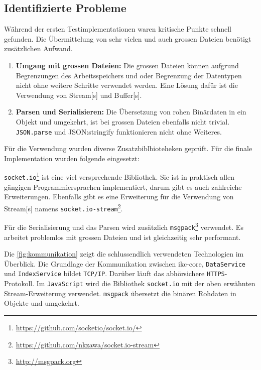 
\subsection{Identifizierte Probleme}


Während der ersten Testimplementationen waren kritische Punkte schnell gefunden. Die Übermittelung von sehr vielen und auch grossen Dateien benötigt zusätzlichen Aufwand.

\begin{enumerate}
    \item \textbf{Umgang mit grossen Dateien:} Die grossen Dateien können auf\-grund Begrenzungen des Arbeitsspeichers und oder Be\-grenz\-ung der Datentypen nicht ohne weitere Schritte verwendet werden. Eine Lösung dafür ist die Verwendung von \gls{Stream}[s] und \gls{Buffer}[s].
    \item \textbf{Parsen und Serialisieren:} Die Übersetzung von rohen Bi\-när\-da\-ten in ein Objekt und umgekehrt, ist bei grossen Dateien ebenfalls nicht trivial. \texttt{JSON.parse} und {JSON:stringify} funktionieren nicht ohne Weiteres.
\end{enumerate}

Für die Verwendung wurden diverse Zusatzbiblbioteheken geprüft. Für die finale Implementation wurden folgende eingesetzt:

\texttt{socket.io}\footnote{\url{https://github.com/socketio/socket.io/}} ist eine viel versprechende Bibliothek. Sie ist in praktisch allen gängigen Programmiersprachen implementiert, darum gibt es auch zahlreiche Erweiterungen. Ebenfalls gibt es eine Erweiterung für die Verwendung von \gls{Stream}[s] namens \texttt{socket.io-stream}\footnote{\url{https://github.com/nkzawa/socket.io-stream}}.

Für die Serialisierung und das Parsen wird zusätzlich \texttt{msgpack}\footnote{\url{http://msgpack.org}} verwendet. Es arbeitet problemlos mit grossen Dateien und ist gleichzeitig sehr performant.

Die \autoref{fig:kommunikation} zeigt die schlussendlich verwendeten Technologien im Überblick. Die Grundlage der Kommunikation zwischen \gls{ikc-core}, \texttt{DataService} und \texttt{IndexService} bildet \texttt{TCP/IP}. Darüber läuft das abhörsichere \texttt{HTTPS}-Protokoll. Im \texttt{JavaScript} wird die Bibliothek \texttt{socket.io} mit der oben erwähnten \gls{Stream}-Erweiterung verwendet. \texttt{msgpack} übersetzt die binären Rohdaten in Objekte und umgekehrt.

